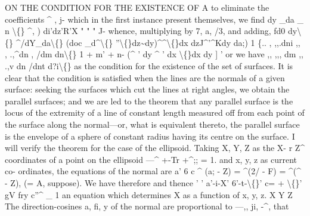 \documentclass[11pt,a4paper]{book}
\begin{document}
ON THE CONDITION FOR THE EXISTENCE OF A
to
eliminate
the
coefficients
\textasciicircum{}
,
j-
which
in
the
first
instance
present
themselves,
we
find
dy \_da \_ n
\textbackslash\{\}
\textasciicircum{},
)
di'dz'R'X
"
"
"
J-
whence, multiplying by
7,
a,
/3, and adding,
fd0
dy\textbackslash\{\}
\textasciicircum{}/dY\_da\textbackslash\{\}
(doc \_d\textasciicircum{}\textbackslash\{\}
''\textbackslash\{\}dz\textasciitilde{}dy)\textasciicircum{}\textasciicircum{}\textbackslash\{\}dx
dzJ\textasciicircum{}'\textasciicircum{}Kdy
da;)
1
\{..
,
,,.dni
,,
,
.,\textasciicircum{}dn
,
/dm
dn\textbackslash\{\}
1 + m' + n-
(\textasciicircum{}
' dy
\textasciicircum{}
' dx
\textbackslash\{\}dx
dy
]
'
or we have
,,
,,, dm
,,
.,v dn
/dnt
d?i\textbackslash\{\}
as the condition
for the existence
of the
set of surfaces.
It
is
clear
that
the
condition
is
satisfied when
the
lines
are
the
normals
of
a
given
surface:
seeking
the
surfaces
which
cut
the
lines
at
right
angles, we
obtain
the
parallel
surfaces;
and we
are
led
to
the
theorem
that
any
parallel
surface
is
the
locus
of
the
extremity of a
line
of
constant
length measured
off
from each
point
of
the
surface
along
the
normal---or,
what
is
equivalent
thereto,
the
parallel
surface
is
the
envelope
of
a
sphere
of
constant
radius
having
its
centre
on
the
surface.
I
will
verify
the
theorem
for
the
case
of
the
ellipsoid.
Taking
X,
Y, Z
as
the
X-
r\guillemotright{}
Z\textasciicircum{}
coordinates
of
a
point
on
the
ellipsoid ---\textasciicircum{} +-Tr +\textasciicircum{};; = 1.
and
x,
y,
z
as
current
co-
ordinates, the equations of the normal are
a'
6\textdegree{}
c\textdegree{}
\textbullet{}\textasciicircum{} (a; - Z) = \textasciicircum{}(2/ - F) = \textasciicircum{}(\textasciicircum{} - Z), (= A, suppose).
We have
therefore
and thence
'
'
a'-i-X'
6'-t-\textbackslash\{\}'
c= + \textbackslash\{\}'
gV
fry
c''\textasciicircum{}\textdegree{}
\_
1
an equation which determines X as a function
of x,
y,
z.
X
Y
Z
The
direction-cosines
a,
fi,
y
of
the
normal
are
proportional
to ---,,
ji,
-\textasciicircum{},
that
\end{document}
